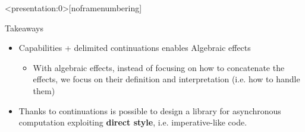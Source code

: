 \documentclass[aspectratio=1610,xcolor=dvipsnames]{beamer}
\begin{document}
\begin{frame}<presentation:0>[noframenumbering]
  \begin{block}{Takeaways}
    \begin{itemize}
      \item Capabilities + delimited continuations enables Algebraic effects
      \begin{itemize}
        \item With algebraic effects, instead of focusing on how to concatenate the effects, we focus on their definition and interpretation (i.e. how to handle them)
      \end{itemize}
      \item Thanks to continuations is possible to design a library for asynchronous computation exploiting \textbf{direct style}, i.e. imperative-like code.
    \end{itemize}
  \end{block}
\end{frame}
\end{document}
